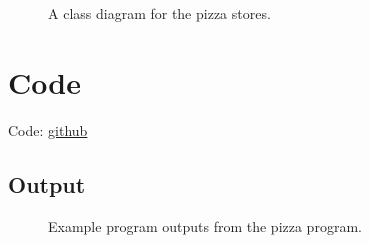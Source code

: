 \begin{figure}[htb]
  \centering
  \caption{\label{Figure::pizzastorediagram} A class diagram for the pizza stores.}
\end{figure}


\section{Code}

Code: \href{https://github.com/dyc3/ssw345-group-assignments}{github}

\subsection{Output}

\begin{figure}[htb]
  \centering
  \caption{\label{Figure::pizzaoutput} Example program outputs from the pizza program.}
\end{figure}